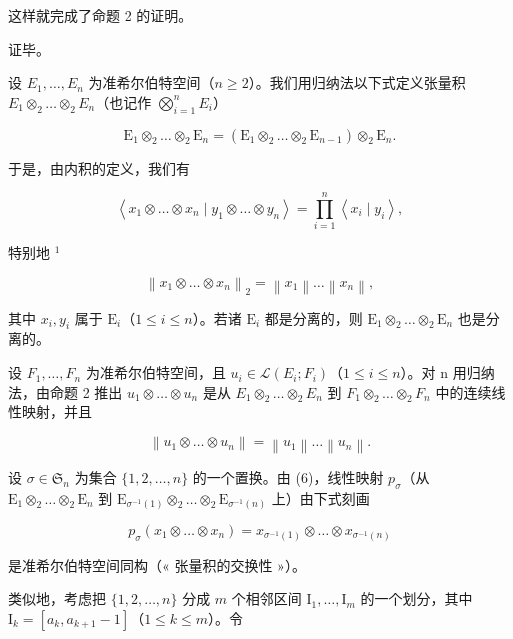 这样就完成了命题 2 的证明。

证毕。

设 \(E_1, \ldots, E_n\) 为准希尔伯特空间（\(n \geqslant 2\)）。我们用归纳法以下式定义张量积 \(E_1 \otimes_2 \ldots \otimes_2 E_n\)（也记作 \(\bigotimes_{i=1}^{n} E_i\)）

\[
\mathrm{E} _ {1} \otimes_ {2} \dots \otimes_ {2} \mathrm{E} _ {n} = (\mathrm{E} _ {1} \otimes_ {2} \dots \otimes_ {2} \mathrm{E} _ {n - 1}) \otimes_ {2} \mathrm{E} _ {n}.
\]

于是，由内积的定义，我们有

\[
\left\langle x _ {1} \otimes \dots \otimes x _ {n} \mid y _ {1} \otimes \dots \otimes y _ {n} \right\rangle = \prod_ {i = 1} ^ {n} \left\langle x _ {i} \mid y _ {i} \right\rangle ,\tag{6}
\]

特别地 \(^{1}\)

\[
\left\| x _ {1} \otimes \dots \otimes x _ {n} \right\| _ {2} = \left\| x _ {1} \right\| \dots \left\| x _ {n} \right\|,\tag{7}
\]

其中 \(x_{i},y_{i}\) 属于 \(\mathrm{E}_i\)（\(1\leqslant i\leqslant n\)）。若诸 \(\mathrm{E}_i\) 都是分离的，则 \(\mathrm{E}_1\otimes_2\dots \otimes_2\mathrm{E}_n\) 也是分离的。

设 \(F_{1}, \ldots, F_{n}\) 为准希尔伯特空间，且 \(u_{i} \in \mathcal{L}(E_{i}; F_{i})\)（\(1 \leqslant i \leqslant n\)）。对 n 用归纳法，由命题 2 推出 \(u_{1} \otimes \ldots \otimes u_{n}\) 是从 \(E_{1} \otimes_{2} \ldots \otimes_{2} E_{n}\) 到 \(F_{1} \otimes_{2} \ldots \otimes_{2} F_{n}\) 中的连续线性映射，并且

\[
\left\| u _ {1} \otimes \dots \otimes u _ {n} \right\| = \left\| u _ {1} \right\| \dots \left\| u _ {n} \right\|.\tag{8}
\]

设 \(\sigma \in \mathfrak{S}_n\) 为集合 \(\{1, 2, \dots, n\}\) 的一个置换。由 (6)，线性映射 \(p_{\sigma}\)（从 \(\mathrm{E}_1 \otimes_2 \dots \otimes_2 \mathrm{E}_n\) 到 \(\mathrm{E}_{\sigma^{-1}(1)} \otimes_2 \dots \otimes_2 \mathrm{E}_{\sigma^{-1}(n)}\) 上）由下式刻画

\[
p _ {\sigma} \left(x _ {1} \otimes \dots \otimes x _ {n}\right) = x _ {\sigma^ {- 1} (1)} \otimes \dots \otimes x _ {\sigma^ {- 1} (n)}\tag{9}
\]

是准希尔伯特空间同构（« 张量积的交换性 »）。

类似地，考虑把 \(\{1, 2, \dots , n\}\) 分成 \(m\) 个相邻区间 \(\mathrm{I}_{1}, \dots , \mathrm{I}_{m}\) 的一个划分，其中 \(\mathrm{I}_{k} = [a_{k}, a_{k + 1} - 1]\)（\(1 \leqslant k \leqslant m\)）。令

